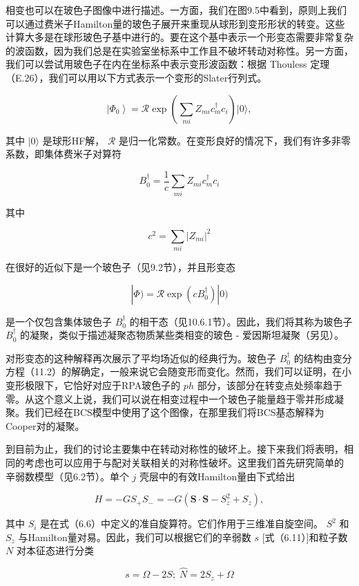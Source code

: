 相变也可以在玻色子图像中进行描述。一方面，我们在图9.5中看到，原则上我们可以通过费米子Hamilton量的玻色子展开来重现从球形到变形形状的转变。这些计算大多是在球形玻色子基中进行的。要在这个基中表示一个形变态需要非常复杂的波函数，因为我们总是在实验室坐标系中工作且不破坏转动对称性。另一方面，我们可以尝试用玻色子在内在坐标系中表示变形波函数：根据
Thouless 定理（E.26），我们可以用以下方式表示一个变形的Slater行列式。

\[
\left|{\Phi}_{0}\right\rangle =\mathcal{R}\exp\left({\mathop{\sum}\limits_{{mi}}{Z}_{mi}c^{\dagger}_{m}{c}_{i}}\right)|0\rangle,\tag{11.13}
\]

其中 $|0\rangle$ 是球形HF解， $\mathcal{R}$ 是归一化常数。在变形良好的情况下，我们有许多非零系数，即集体费米子对算符

\[
B^{\dagger}_{0}=\frac{1}{c}\mathop{\sum}\limits_{{mi}}{Z}_{mi}c^{\dagger}_{m}{c}_{i}\tag{11.14}
\]

其中

\[
{c}^{2}=\mathop{\sum}\limits_{{mi}}{\left|{Z}_{mi}\right|}^{2}
\]

在很好的近似下是一个玻色子（见9.2节），并且形变态

\[
|\Phi)=\mathcal{R}\exp(cB^{\dagger}_{0})|0)
\]

是一个仅包含集体玻色子 $B^{\dagger}_{0}$ 的相干态（见10.6.1节）。因此，我们将其称为玻色子 $B^{\dagger}_{0}$
的凝聚，类似于描述凝聚态物质某些类相变的玻色 - 爱因斯坦凝聚（另见\cite{SP77a}）。

对形变态的这种解释再次展示了平均场近似的经典行为。玻色子 $B^{\dagger}_{0}$ 的结构由变分方程（11.2）的解确定，一般来说它会随变形而变化。然而，我们可以证明，在小变形极限下，它恰好对应于RPA玻色子的
${ph}$ 部分，该部分在转变点处频率趋于零。从这个意义上说，我们可以说在相变过程中一个玻色子能量趋于零并形成凝聚。我们已经在BCS模型中使用了这个图像，在那里我们将BCS基态解释为Cooper对的凝聚。

到目前为止，我们的讨论主要集中在转动对称性的破坏上。接下来我们将表明，相同的考虑也可以应用于与配对关联相关的对称性破坏。这里我们首先研究简单的
辛弱数模型（见6.2节）。单个 $j$ 壳层中的有效Hamilton量由下式给出

\[
H=-G{S}_{+}{S}_{-}=-G\left({\boldsymbol{S}\cdot\boldsymbol{S}-{S}^{2}_{z}+{S}_{z}}\right),\tag{11.15}
\]

其中 ${S}_{i}$ 是在式（6.6）中定义的准自旋算符。它们作用于三维准自旋空间。 ${S}^{2}$ 和 ${S}_{z}$
与Hamilton量对易。因此，我们可以根据它们的辛弱数 $s$ {[}式（6.11）{]}和粒子数 $N$ 对本征态进行分类

\[
s=\Omega-{2S};\;\widehat{N}=2{S}_{z}+\Omega\tag{11.16}
\]

